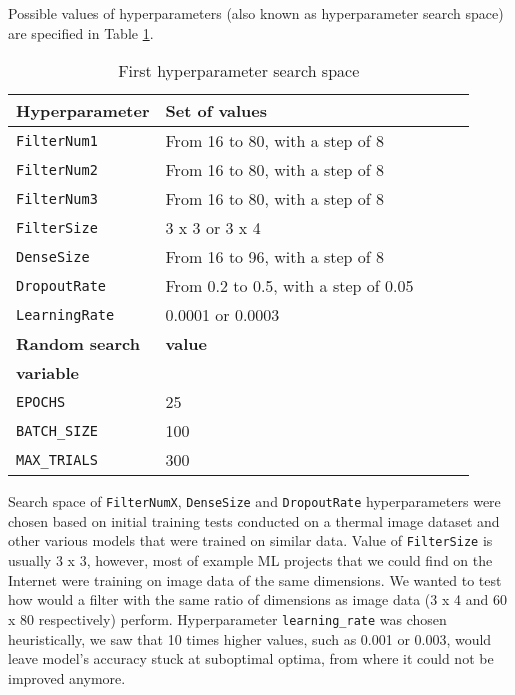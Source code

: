 Possible values of hyperparameters (also known as hyperparameter search space) are specified in Table \ref{hyper_table1}.
\newline
\begin{table}[ht]
    \centering
    \caption{ First hyperparameter search space}
    \begin{tabular}{@{} *5l @{}}    \toprule
        \textbf{Hyperparameter} & \textbf{Set of values}\\\midrule
        \verb|FilterNum1|       & From 16 to 80, with a step of 8\\ 
        \verb|FilterNum2|       & From 16 to 80, with a step of 8\\ 
        \verb|FilterNum3|       & From 16 to 80, with a step of 8\\
        \verb|FilterSize|       & 3 x 3 or 3 x 4\\
        \verb|DenseSize|        & From 16 to 96, with a step of 8\\
        \verb|DropoutRate|      & From 0.2 to 0.5, with a step of 0.05\\
        \verb|LearningRate|     & 0.0001 or 0.0003\\\toprule
        \textbf{Random search}  & \textbf{value}\\
        \textbf{variable}       & \\\midrule
        \verb|EPOCHS|           & 25\\
        \verb|BATCH_SIZE|       & 100\\
        \verb|MAX_TRIALS|       & 300\\\bottomrule
    \end{tabular}
    \label{hyper_table1}
\end{table}

Search space of \verb|FilterNumX|, \verb|DenseSize| and \verb|DropoutRate| hyperparameters were chosen based on initial training tests conducted on a thermal image dataset and other various models that were trained on similar data.
Value of \verb|FilterSize| is usually 3 x 3, however, most of example ML projects that we could find on the Internet were training on image data of the same dimensions.
We wanted to test how would a filter with the same ratio of dimensions as image data (3 x 4 and 60 x 80 respectively) perform.
Hyperparameter \verb|learning_rate| was chosen heuristically, we saw that 10 times higher values, such as 0.001 or 0.003, would leave model's accuracy stuck at suboptimal optima, from where it could not be improved anymore.


